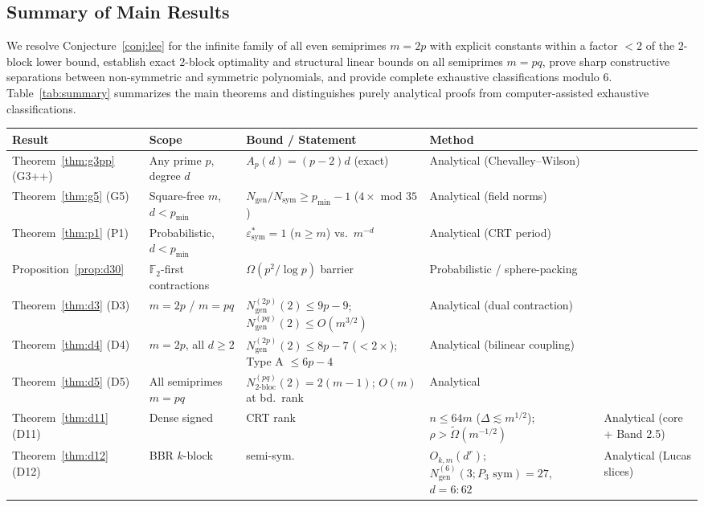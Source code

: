 \documentclass[11pt,a4paper]{article}
\theoremstyle{definition}
\newcommand{\F}{\mathbb{F}}
\newcommand{\Nsym}{N_{\mathrm{sym}}}
\newcommand{\Ngen}{N_{\mathrm{gen}}}
\newcommand{\Ntwobloc}{N_{\mathrm{2\text{-}bloc}}}
\begin{document}
\subsection{Summary of Main Results}

We resolve Conjecture~\ref{conj:lee} for the infinite family of all even semiprimes $m = 2p$ with explicit constants within a factor $< 2$ of the $2$-block lower bound, establish exact $2$-block optimality and structural linear bounds on all semiprimes $m = pq$, prove sharp constructive separations between non-symmetric and symmetric polynomials, and provide complete exhaustive classifications modulo $6$. Table~\ref{tab:summary} summarizes the main theorems and distinguishes purely analytical proofs from computer-assisted exhaustive classifications.

\begin{table}[ht]
\centering
\small
\begin{tabular}{@{}llll@{}}
\toprule
\textbf{Result} & \textbf{Scope} & \textbf{Bound / Statement} & \textbf{Method} \\
\midrule
Theorem~\ref{thm:g3pp} (G3++) & Any prime $p$, degree $d$ & $A_p(d) = (p-2)d$ (exact) & Analytical (Chevalley--Wilson) \\
Theorem~\ref{thm:g5} (G5) & Square-free $m$, $d < p_{\min}$ & $\Ngen/\Nsym \ge p_{\min}-1$ ($4\times$ mod $35$) & Analytical (field norms) \\
Theorem~\ref{thm:p1} (P1) & Probabilistic, $d < p_{\min}$ & $\varepsilon_{\mathrm{sym}}^* = 1$ ($n \ge m$) vs.\ $m^{-d}$ & Analytical (CRT period) \\
Proposition~\ref{prop:d30} & $\F_2$-first contractions & $\Omega(p^2 / \log p)$ barrier & Probabilistic / sphere-packing \\
Theorem~\ref{thm:d3} (D3) & $m = 2p$ / $m = pq$ & $\Ngen^{(2p)}(2) \le 9p-9$; $\Ngen^{(pq)}(2) \le O(m^{3/2})$ & Analytical (dual contraction) \\
Theorem~\ref{thm:d4} (D4) & $m = 2p$, all $d \ge 2$ & $\Ngen^{(2p)}(2) \le 8p-7$ ($< 2\times$); Type A $\le 6p-4$ & Analytical (bilinear coupling) \\
Theorem~\ref{thm:d5} (D5) & All semiprimes $m = pq$ & $\Ntwobloc^{(pq)}(2) = 2(m-1)$; $O(m)$ at bd.\ rank & Analytical \\
Theorem~\ref{thm:d11} (D11) & Dense signed & CRT rank & $n \le 64m$ ($\Delta \lesssim m^{1/2}$); $\rho > \tilde{\Omega}(m^{-1/2})$ & Analytical (core + Band 2.5) \\
Theorem~\ref{thm:d12} (D12) & BBR $k$-block & semi-sym. & $O_{k,m}(d^r)$; $\Ngen^{(6)}(3; P_3\text{ sym}) = 27$, $d=6: 62$ & Analytical (Lucas slices) \\

\end{tabular}
\end{table}
\end{document}

